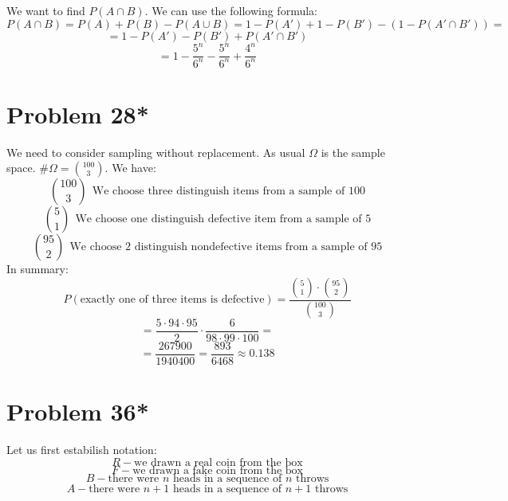 \documentclass{article}
\begin{document}
We want to find \(P(A \cap B)\). We can use the following formula:
\begin{equation*}
    P(A \cap B) = P(A) + P(B) - P(A \cup B) = 1 - P(A') + 1 - P(B') - (1 - P(A' \cap B')) = 
\end{equation*} 
\begin{equation*}
    = 1 - P(A') - P(B') + P(A' \cap B')
\end{equation*}
\begin{equation*}
    = 1 - \frac{5^n}{6^n} - \frac{5^n}{6^n} + \frac{4^n}{6^n} 
\end{equation*}

\section*{Problem 28*}
We need to consider sampling without replacement. As usual \(\Omega\) is the sample space. \(\# \Omega = \binom{100}{3}\). We have:
\begin{equation*}
    \binom{100}{3} \ \ \mbox{We choose three distinguish items from a sample of 100}
\end{equation*}
\begin{equation*}
    \binom{5}{1} \ \ \mbox{We choose one distinguish defective item from a sample of 5}
\end{equation*}
\begin{equation*}
    \binom{95}{2} \ \ \mbox{We choose 2 distinguish nondefective items from a sample of 95}
\end{equation*}
In summary:
\begin{equation*}
    P(\mbox{exactly one of three items is defective}) =  \frac{\binom{5}{1} \cdot \binom{95}{2}}{\binom{100}{3}}
\end{equation*}
\begin{equation*}
    = \frac{5 \cdot 94 \cdot 95}{2} \cdot \frac{6}{98 \cdot 99 \cdot 100} = 
\end{equation*}
\begin{equation*}
    = \frac{267900}{1940400} = \frac{893}{6468} \approx 0.138
\end{equation*}

\section*{Problem 36*}
Let us first estabilish notation:
\begin{equation*}
    R - \mbox{we drawn a real coin from the box}
\end{equation*}
\begin{equation*}
    F - \mbox{we drawn a fake coin from the box}
\end{equation*}
\begin{equation*}
    B - \mbox{there were \(n\) heads in a sequence of \(n\) throws}
\end{equation*}
\begin{equation*}
    A - \mbox{there were \(n + 1\) heads in a sequence of \(n + 1\) throws}
\end{equation*}
\end{document}
